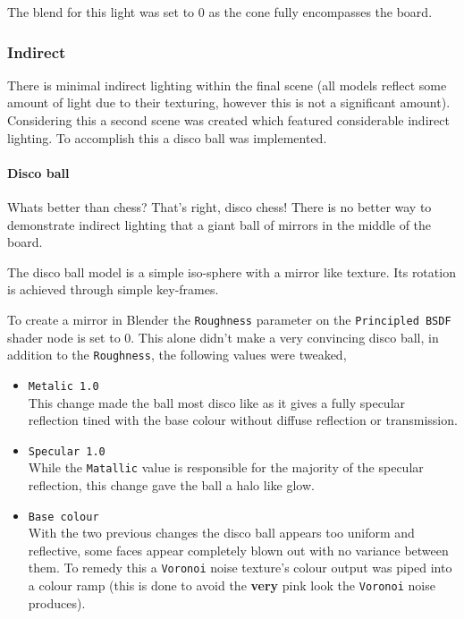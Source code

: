\documentclass[11pt]{article}
\begin{document}
The blend for this light was set to 0 as the cone fully encompasses the board.
\subsubsection{Indirect}
\label{sec:org750ed8f}
There is minimal indirect lighting within the final scene (all models
reflect some amount of light due to their texturing, however this is not a
significant amount). Considering this a second scene was created which featured
considerable indirect lighting. To accomplish this a disco ball was implemented.
\paragraph{Disco ball}
\label{sec:org64438b9}
Whats better than chess? That's right, disco chess! There is no better way to
demonstrate indirect lighting that a giant ball of mirrors in the middle of the board.

The disco ball model is a simple iso-sphere with a mirror like texture. Its
rotation is achieved through simple key-frames.

To create a mirror in Blender the \texttt{Roughness} parameter on the \texttt{Principled BSDF}
shader node is set to 0. This alone didn't make a very convincing disco ball, in
addition to the \texttt{Roughness}, the following values were tweaked,
\begin{itemize}
\item \texttt{Metalic 1.0}\\
This change made the ball most disco like as it gives a fully specular
reflection tined with the base colour without diffuse reflection or
transmission.
\item \texttt{Specular 1.0}\\
While the \texttt{Matallic} value is responsible for the majority of the specular
reflection, this change gave the ball a halo like glow.
\item \texttt{Base colour}\\
With the two previous changes the disco ball appears too uniform and reflective, some
faces appear completely blown out with no variance between them. To remedy
this a \texttt{Voronoi} noise texture's colour output was piped into a colour ramp
(this is done to avoid the \textbf{very} pink look  the \texttt{Voronoi} noise produces).
\end{itemize}
\end{document}
